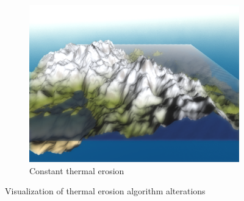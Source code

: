\documentclass[11pt,a4paper,twoside,openright]{report}
\begin{document}
\begin{figure}[h]
\begin{subfigure}[b]{0.32\textwidth}
    \includegraphics[width=\textwidth]{thermal-50-iterations-after2.png}
    \caption{Constant thermal erosion}
    \label{fig:thermalafter2}
  \end{subfigure}
  \caption{Visualization of thermal erosion algorithm alterations}
\end{figure}
\end{document}

